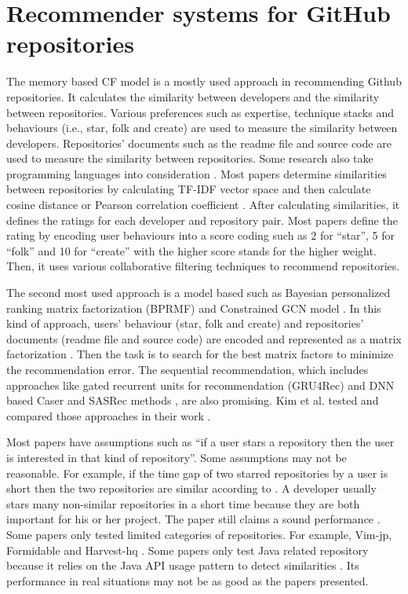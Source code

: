 \documentclass[11pt,twoside]{report}
\begin{document}
\section{Recommender systems for GitHub repositories}
The memory based CF model is a mostly used approach in recommending Github repositories. It calculates the similarity between developers and the similarity between repositories. Various preferences such as expertise, technique stacks and behaviours (i.e., star, folk and create) are used to measure the similarity between developers. Repositories' documents such as the readme file and source code are used to measure the similarity between repositories. Some research also take programming languages into consideration \cite{inka_open_2018, sun_personalized_2018}. Most papers determine similarities between repositories by calculating TF-IDF vector space and then calculate cosine distance or Pearson correlation coefficient \cite{mansur_review_nodate, kim_sequential_2021}. After calculating similarities, it defines the ratings for each developer and repository pair. Most papers define the rating by encoding user behaviours into a score coding such as 2 for “star”, 5 for “folk” and 10 for “create” with the higher score stands for the higher weight. Then, it uses various collaborative filtering techniques to recommend repositories.

The second most used approach is a model based such as Bayesian personalized ranking matrix factorization (BPRMF) \cite{jiang_open_2017} and Constrained GCN model \cite{shao_paper2repo_2020}. In this kind of approach, users’ behaviour (star, folk and create) and repositories’ documents (readme file and source code) are encoded and represented as a matrix factorization \cite{jiang_open_2017}. Then the task is to search for the best matrix factors to minimize the recommendation error. The sequential recommendation, which includes approaches like gated recurrent units for recommendation (GRU4Rec) and DNN based Caser and SASRec methods \cite{kim_sequential_2021}, are also promising. Kim et al. \cite{kim_sequential_2021} tested and compared those approaches in their work \cite{kim_sequential_2021}.

Most papers have assumptions such as “if a user stars a repository then the user is interested in that kind of repository”. Some assumptions may not be reasonable. For example, if the time gap of two starred repositories by a user is short then the two repositories are similar according to \cite{zhang_detecting_2017}. A developer usually stars many non-similar repositories in a short time because they are both important for his or her project. The paper still claims a sound performance \cite{zhang_detecting_2017}. Some papers only tested limited categories of repositories. For example, Vim-jp, Formidable and Harvest-hq \cite{sun_personalized_2018, xu_repersp_2017}. Some papers only test Java related repository because it relies on the Java API usage pattern to detect similarities \cite{zhang_detecting_2017}. Its performance in real situations may not be as good as the papers presented.
\end{document}
